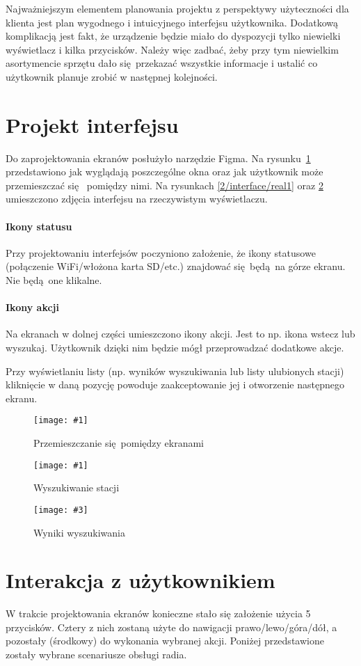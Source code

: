 \documentclass[12pt]{report}
\newcommand{\imgint}[4]{
	\begin{figure}[{#4}]
		\centering
		\texttt{[image: \#1]}
		\caption{#2}
		\label{#1}
	\end{figure}
}
\newcommand{\imgcs}[3]{\imgint{#1}{#2}{#3}{}}
\newcommand{\imgintss}[5]{
	\begin{figure}[{#5}]
		\centering
		\begin{minipage}{.45\textwidth}
			\centering
			\texttt{[image: \#1]}
			\caption{#2}
			\label{#1}
		\end{minipage}%
		\hfill
		\begin{minipage}{.45\textwidth}
			\centering
			\texttt{[image: \#3]}
			\caption{#4}
			\label{#3}
		\end{minipage}
	\end{figure}
}
\newcommand{\imgss}[4]{\imgintss{#1}{#2}{#3}{#4}{}}
\begin{document}
	Najważniejszym elementem planowania projektu z perspektywy użyteczności dla klienta jest plan wygodnego i intuicyjnego interfejsu użytkownika. Dodatkową komplikacją jest fakt, że urządzenie będzie miało do dyspozycji tylko niewielki wyświetlacz i kilka przycisków. Należy więc zadbać, żeby przy tym niewielkim asortymencie sprzętu dało się przekazać wszystkie informacje i ustalić co użytkownik planuje zrobić w następnej kolejności.
		
	\section{Projekt interfejsu}
		Do zaprojektowania ekranów posłużyło narzędzie Figma\textsuperscript{\cite{figma}}. Na rysunku~\ref{2/interface/all} przedstawiono jak wyglądają poszczególne okna oraz jak użytkownik może przemieszczać się  pomiędzy nimi. Na rysunkach \ref{2/interface/real1} oraz \ref{2/interface/real2} umieszczono zdjęcia interfejsu na rzeczywistym wyświetlaczu.
		
		\paragraph{Ikony statusu}
			Przy projektowaniu interfejsów poczyniono założenie, że ikony statusowe (połączenie WiFi/włożona karta SD/etc.) znajdować się będą na górze ekranu. Nie będą one klikalne.
			
		\paragraph{Ikony akcji}
			Na ekranach w dolnej części umieszczono ikony akcji. Jest to np. ikona wstecz lub wyszukaj. Użytkownik dzięki nim będzie mógł przeprowadzać dodatkowe akcje.
		
		$ $\\
		Przy wyświetlaniu listy (np. wyników wyszukiwania lub listy ulubionych stacji) kliknięcie w daną pozycję powoduje zaakceptowanie jej i otworzenie następnego ekranu.

		\imgcs{2/interface/all}{Przemieszczanie się pomiędzy ekranami}{0.9}
		\imgss{2/interface/real1}{Wyszukiwanie stacji}{2/interface/real2}{Wyniki wyszukiwania}
	
	\section{Interakcja z użytkownikiem}
		W trakcie projektowania ekranów konieczne stało się założenie użycia 5 przycisków. Cztery z nich zostaną użyte do nawigacji prawo/lewo/góra/dół, a pozostały (środkowy) do wykonania wybranej akcji. Poniżej przedstawione zostały wybrane scenariusze obsługi radia.
		
\end{document}
